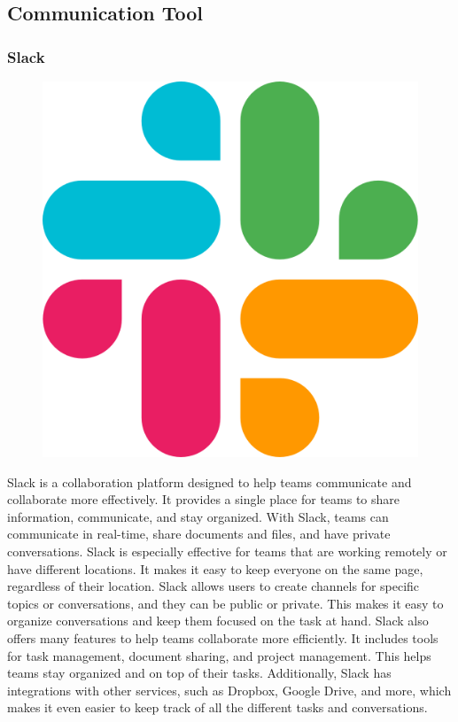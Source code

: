 \documentclass[12pt,a4paper]{report}
\begin{document}
\subsection{Communication Tool}

\subsubsection*{Slack}

\begin{figure}
\includegraphics[width=1\linewidth]{slack.png}
\end{figure}

Slack is a collaboration platform designed to help teams communicate and collaborate more effectively. It provides a single place for teams to share information, communicate, and stay organized. With Slack, teams can communicate in real-time, share documents and files, and have private conversations. Slack is especially effective for teams that are working remotely or have different locations. It makes it easy to keep everyone on the same page, regardless of their location. Slack allows users to create channels for specific topics or conversations, and they can be public or private. This makes it easy to organize conversations and keep them focused on the task at hand. Slack also offers many features to help teams collaborate more efficiently. It includes tools for task management, document sharing, and project management. This helps teams stay organized and on top of their tasks. Additionally, Slack has integrations with other services, such as Dropbox, Google Drive, and more, which makes it even easier to keep track of all the different tasks and conversations.
\end{document}
